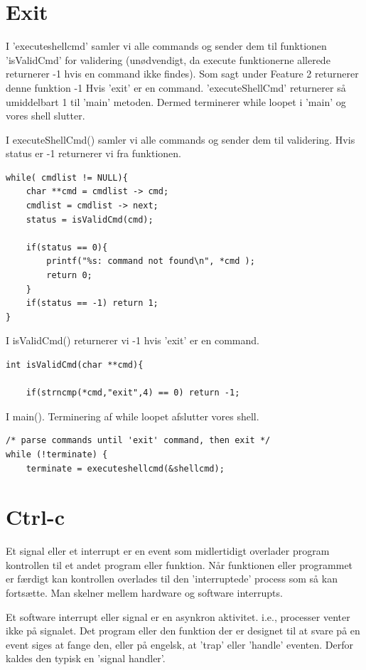 \documentclass[danish]{report}
\begin{document}
\section{Exit}


I 'executeshellcmd' samler vi alle commands og sender dem til funktionen 'isValidCmd' for validering (unødvendigt, da execute funktionerne allerede returnerer -1 hvis en command ikke findes). Som sagt under Feature 2 returnerer denne funktion -1 Hvis 'exit' er en command. 'executeShellCmd' returnerer så umiddelbart 1 til 'main' metoden. Dermed terminerer while loopet i 'main' og vores shell slutter. 

I executeShellCmd() samler vi alle commands og sender dem til validering. Hvis status er -1 returnerer vi fra funktionen.


\begin{lstlisting}
while( cmdlist != NULL){
	char **cmd = cmdlist -> cmd;
	cmdlist = cmdlist -> next;
	status = isValidCmd(cmd);

	if(status == 0){ 
		printf("%s: command not found\n", *cmd );
		return 0;
	}
	if(status == -1) return 1;
}
\end{lstlisting}

I isValidCmd() returnerer vi -1 hvis 'exit' er en command.
\begin{lstlisting}
int isValidCmd(char **cmd){
	
	if(strncmp(*cmd,"exit",4) == 0) return -1;
\end{lstlisting}

I main(). Terminering af while loopet afslutter vores shell. 
\begin{lstlisting}
/* parse commands until 'exit' command, then exit */
while (!terminate) {
	terminate = executeshellcmd(&shellcmd);
\end{lstlisting}

\section{Ctrl-c}

Et signal eller et interrupt er en event som midlertidigt overlader program kontrollen til et andet program eller funktion. Når funktionen eller programmet er færdigt kan kontrollen overlades til den 'interruptede' process som så kan fortsætte. Man skelner mellem hardware og software interrupts.

Et software interrupt eller signal er en asynkron aktivitet. i.e., processer venter ikke på signalet. Det program eller den funktion der er designet til at svare på en event siges at fange den, eller på engelsk,  at 'trap' eller 'handle' eventen. Derfor kaldes den typisk en 'signal handler'. 
\end{document}
